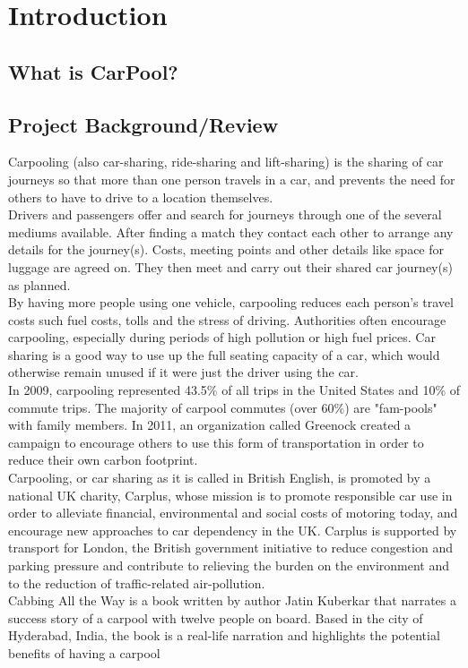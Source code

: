 \chapter{Introduction} \label{chap:intro}

\section*{What is CarPool?}

\section{Project Background/Review}

Carpooling (also car-sharing, ride-sharing and lift-sharing) is the sharing of car journeys so that more than one person travels in a car, and prevents the need for others to have to drive to a location themselves.
\\ Drivers and passengers offer and search for journeys through one of the several mediums available. After finding a match they contact each other to arrange any details for the journey(s). Costs, meeting points and other details like space for luggage are agreed on. They then meet and carry out their shared car journey(s) as planned.
\\ By having more people using one vehicle, carpooling reduces each person's travel costs such fuel costs, tolls and the stress of driving. Authorities often encourage carpooling, especially during periods of high pollution or high fuel prices. Car sharing is a good way to use up the full seating capacity of a car, which would otherwise remain unused if it were just the driver using the car.
\\ In 2009, carpooling represented 43.5\% of all trips in the United States and 10\% of commute trips. The majority of carpool commutes (over 60\%) are "fam-pools" with family members.
In 2011, an organization called Greenock created a campaign to encourage others to use this form of transportation in order to reduce their own carbon footprint.
\\ Carpooling, or car sharing as it is called in British English, is promoted by a national UK charity, Carplus, whose mission is to promote responsible car use in order to alleviate financial, environmental and social costs of motoring today, and encourage new approaches to car dependency in the UK. Carplus is supported by transport for London, the British government initiative to reduce congestion and parking pressure and contribute to relieving the burden on the environment and to the reduction of traffic-related air-pollution.
\\ Cabbing All the Way is a book written by author Jatin Kuberkar that narrates a success story of a carpool with twelve people on board. Based in the city of Hyderabad, India, the book is a real-life narration and highlights the potential benefits of having a carpool

